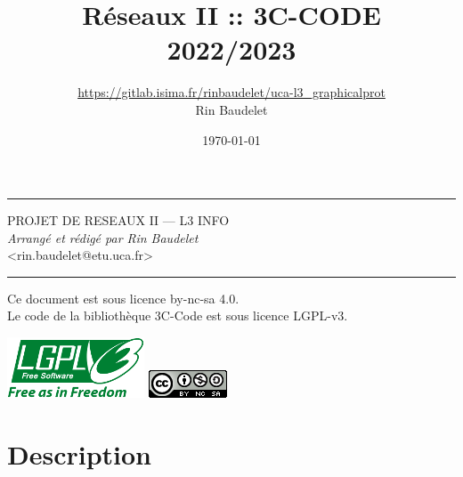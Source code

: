 \documentclass[12pt,a4paper]{article}
\title{Réseaux II :: 3C-CODE\\\small{2022/2023}}
\author{\url{https://gitlab.isima.fr/rinbaudelet/uca-l3_graphicalprot}\\Rin Baudelet}
\date{\today}
\newcommand{\jmpP}[0]{\vspace*{6mm}}
\begin{document}
\maketitle 
\rule{\linewidth}{0.2mm}
\begin{flushleft}
{\large \uppercase{PROJET DE RESEAUX II} — L3 INFO} \\
\jmpP
{
	\centering
	\hfill \textit{Arrangé et rédigé par Rin Baudelet}\\
	\hfill <rin.baudelet@etu.uca.fr>
}
\vspace*{-3mm}
\end{flushleft}
\rule{\linewidth}{0.2mm}
\tableofcontents
\vfill
\begin{center}
\begin{tcolorbox}[width=126mm]
\centering
Ce document est sous licence by-nc-sa 4.0. \\
Le code de la bibliothèque 3C-Code est sous licence LGPL-v3.
\end{tcolorbox}
\vspace*{5mm}
\href{https://www.gnu.org/licenses/lgpl-3.0.html}{\includegraphics[scale=0.63]{lgplv3-with-text-154x68.png}}
\hspace*{15mm}
\href{http://creativecommons.org/licenses/by-nc-sa/4.0/}{\includegraphics{88x31.png}}
\end{center}
\thispagestyle{basic}
\pagebreak
%
%
\section{Description}

%
%
\pagebreak
{}
\printnoidxglossary[title=Liste des définitions,toctitle=Liste des définitions]
\listoffigures
{}
\listoftables
\thispagestyle{theannex}
\end{document}
